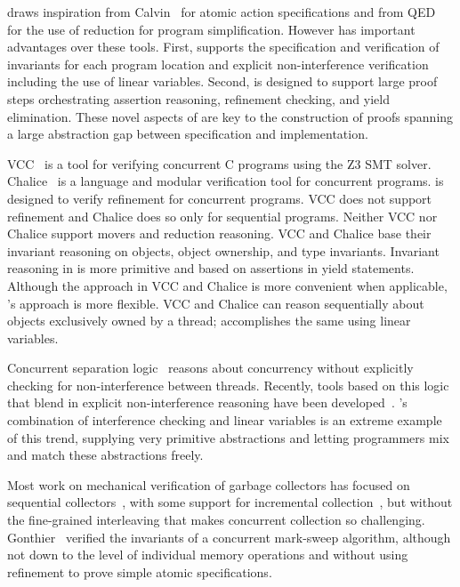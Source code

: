 \civl draws inspiration from Calvin~\cite{FlanaganFQS05} for atomic action specifications
and from QED~\cite{ElmasQT09} for the use of reduction for program simplification.
However \civl has important advantages over these tools.
First, \civl supports the specification and verification of invariants for each program location 
and explicit non-interference verification including the use of linear variables. 
Second, \civl is designed to support large proof steps orchestrating assertion reasoning, 
refinement checking, and yield elimination.
These novel aspects of \civl are key to the construction of proofs spanning a large abstraction gap
between specification and implementation.

VCC~\cite{VCC} is a tool for verifying concurrent C programs using the Z3 SMT solver.  
Chalice~\cite{LM09} is a language and modular verification tool for concurrent programs. 
\civl is designed to verify refinement for concurrent programs.  
VCC does not support refinement and Chalice does so only for sequential programs. 
Neither VCC nor Chalice support movers and reduction reasoning.
VCC and Chalice base their invariant reasoning on objects, object ownership, and type invariants. 
Invariant reasoning in \civl is more primitive and based on assertions in yield statements. 
Although the approach in VCC and Chalice is more convenient when applicable, \civl's approach is more flexible. 
VCC and Chalice can reason sequentially about objects exclusively owned by a thread;
\civl accomplishes the same using linear variables.

Concurrent separation logic~\cite{OHearn07} reasons about concurrency without 
explicitly checking for non-interference between threads. 
Recently, tools based on this logic that blend in explicit non-interference reasoning have been developed~\cite{SAGL,RGSep}. 
\civl's combination of interference checking and linear variables is an extreme example of this trend,
supplying very primitive abstractions and letting programmers mix and match these abstractions freely.

Most work on mechanical verification of garbage collectors has focused on sequential collectors~\cite{mccr07,hawb09},
with some support for incremental collection~\cite{mccr07},
but without the fine-grained interleaving that makes concurrent collection so challenging.
Gonthier~\cite{gont96} verified the invariants of a concurrent mark-sweep algorithm,
although not down to the level of individual memory operations
and without using refinement to prove simple atomic specifications.

